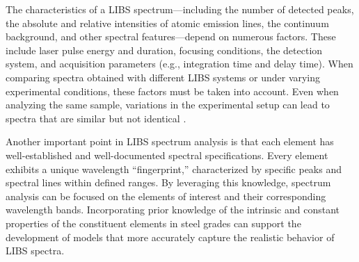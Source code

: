 \documentclass[12pt,a4paper]{article}
\begin{document}
	
	The characteristics of a LIBS spectrum—including the number of detected peaks, the absolute and relative intensities of atomic emission lines, the continuum background, and other spectral features—depend on numerous factors. These include laser pulse energy and duration, focusing conditions, the detection system, and acquisition parameters (e.g., integration time and delay time). 	  
	When comparing spectra obtained with different LIBS systems or under varying experimental conditions, these factors must be taken into account. Even when analyzing the same sample, variations in the experimental setup can lead to spectra that are similar but not identical \cite{AppliedPhotonics2019LIBSQualitative}.
	
	Another important point in LIBS spectrum analysis is that each element has well-established and well-documented spectral specifications. Every element exhibits a unique wavelength “fingerprint,” characterized by specific peaks and spectral lines within defined ranges. By leveraging this knowledge, spectrum analysis can be focused on the elements of interest and their corresponding wavelength bands. Incorporating prior knowledge of the intrinsic and constant properties of the constituent elements in steel grades can support the development of models that more accurately capture the realistic behavior of LIBS spectra. 
	
	 
	 
	
\end{document}
